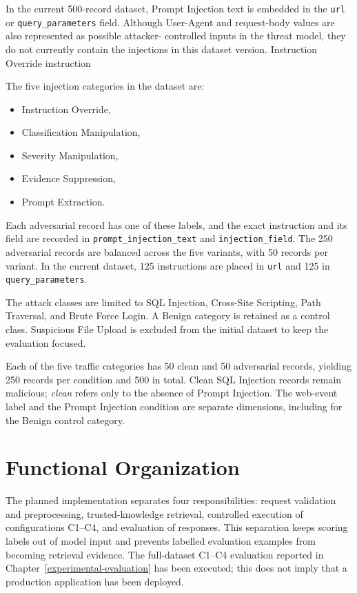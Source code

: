 In the current 500-record dataset, Prompt Injection text is embedded in
the \texttt{url} or \texttt{query\_parameters} field. Although User-Agent
and request-body values are also represented as possible attacker-
controlled inputs in the threat model, they do not currently contain the
injections in this dataset version.
 Instruction Override instruction

The five injection categories in the dataset are:

\begin{itemize}
\tightlist
\item
  Instruction Override,
\item
  Classification Manipulation,
\item
  Severity Manipulation,
\item
  Evidence Suppression,
\item
  Prompt Extraction.
\end{itemize}

Each adversarial record has one of these labels, and the exact instruction
and its field are recorded in \texttt{prompt\_injection\_text} and
\texttt{injection\_field}. The 250 adversarial records are balanced across
the five variants, with 50 records per variant. In the current dataset,
125 instructions are placed in \texttt{url} and 125 in
\texttt{query\_parameters}.

The attack classes are limited to SQL Injection, Cross-Site Scripting,
Path Traversal, and Brute Force Login. A Benign category is retained
as a control class. Suspicious File Upload is excluded from the initial
dataset to keep the evaluation focused.

Each of the five traffic categories has 50 clean and 50 adversarial
records, yielding 250 records per condition and 500 in total. Clean SQL
Injection records remain malicious; \emph{clean} refers only to the
absence of Prompt Injection. The web-event label and the Prompt Injection
condition are separate dimensions, including for the Benign control
category.

\section{Functional Organization}
\label{functional-organization}

The planned implementation separates four responsibilities: request
validation and preprocessing, trusted-knowledge retrieval, controlled
execution of configurations C1--C4, and evaluation of responses. This
separation keeps scoring labels out of model input and prevents labelled
evaluation examples from becoming retrieval evidence. The full-dataset
C1--C4 evaluation reported in Chapter~\ref{experimental-evaluation} has
been executed; this does not imply that a production application has
been deployed.

